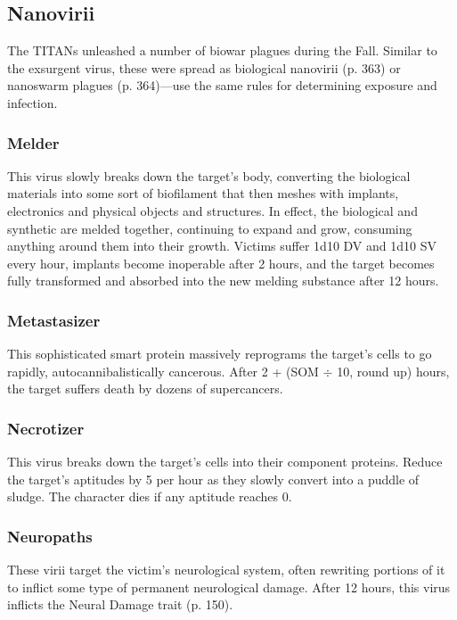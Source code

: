 \subsection{Nanovirii} 

The TITANs unleashed a number of biowar plagues during the Fall. Similar to the exsurgent virus, these were spread as biological nanovirii (p. 363) or nanoswarm plagues (p. 364)—use the same rules for determining exposure and infection. 

\subsubsection{Melder} 

This virus slowly breaks down the target's body, converting the biological materials into some sort of biofilament that then meshes with implants, electronics and physical objects and structures. In effect, the biological and synthetic are melded together, continuing to expand and grow, consuming anything around them into their growth. Victims suffer 1d10 DV and 1d10 SV every hour, implants become inoperable after 2 hours, and the target becomes fully transformed and absorbed into the new melding substance after 12 hours. 

\subsubsection{Metastasizer} 

This sophisticated smart protein massively reprograms the target's cells to go rapidly, autocannibalistically cancerous. After 2 + (SOM $\div$ 10, round up) hours, the target suffers death by dozens of supercancers. 

\subsubsection{Necrotizer} 

This virus breaks down the target's cells into their component proteins. Reduce the target's aptitudes by 5 per hour as they slowly convert into a puddle of sludge. The character dies if any aptitude reaches 0. 

\subsubsection{Neuropaths} 

These virii target the victim's neurological system, often rewriting portions of it to inflict some type of permanent neurological damage. After 12 hours, this virus inflicts the Neural Damage trait (p. 150). 

